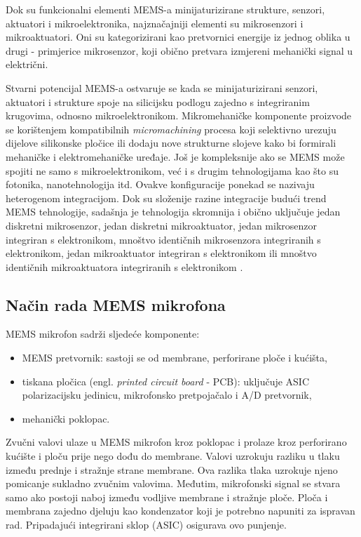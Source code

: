 Dok su funkcionalni elementi MEMS-a minijaturizirane strukture, senzori, aktuatori i mikroelektronika, najznačajniji elementi su mikrosenzori i mikroaktuatori. Oni su  kategorizirani kao pretvornici energije iz jednog oblika u drugi - primjerice mikrosenzor, koji obično pretvara izmjereni mehanički signal u električni.

Stvarni potencijal MEMS-a ostvaruje se kada se minijaturizirani senzori, aktuatori i strukture spoje na silicijsku podlogu zajedno s integriranim krugovima, odnosno mikroelektronikom. Mikromehaničke komponente proizvode se korištenjem kompatibilnih \textit{micromachining} procesa koji selektivno urezuju dijelove silikonske pločice ili dodaju nove strukturne slojeve kako bi formirali mehaničke i elektromehaničke uređaje. Još je kompleksnije ako se MEMS može spojiti ne samo s mikroelektronikom, već i s drugim tehnologijama kao što su fotonika, nanotehnologija itd. Ovakve konfiguracije ponekad se nazivaju heterogenom integracijom. Dok su složenije razine integracije budući trend MEMS tehnologije, sadašnja je tehnologija skromnija i obično uključuje jedan diskretni mikrosenzor, jedan diskretni mikroaktuator, jedan mikrosenzor integriran s elektronikom, mnoštvo identičnih mikrosenzora integriranih s elektronikom, jedan mikroaktuator integriran s elektronikom ili mnoštvo identičnih mikroaktuatora integriranih s elektronikom \cite{whatismems_tech}. 
 

\subsection{Način rada MEMS mikrofona}

MEMS mikrofon sadrži sljedeće komponente:
\begin{itemize}
	\item MEMS pretvornik: sastoji se od membrane, perforirane ploče i kućišta,
	\item tiskana pločica (engl. \textit{printed circuit board} - PCB): uključuje ASIC polarizacijsku jedinicu, mikrofonsko pretpojačalo i A/D pretvornik,
	\item mehanički poklopac.
\end{itemize}

Zvučni valovi ulaze u MEMS mikrofon kroz poklopac i prolaze kroz perforirano kućište i ploču prije nego dođu do membrane. Valovi uzrokuju razliku u tlaku između prednje i stražnje strane membrane. Ova razlika tlaka uzrokuje njeno pomicanje sukladno zvučnim valovima. Međutim, mikrofonski signal se stvara samo ako postoji naboj između vodljive membrane i stražnje ploče. 
Ploča i membrana zajedno djeluju kao kondenzator koji je potrebno napuniti za ispravan
rad. Pripadajući integrirani sklop (ASIC) osigurava ovo punjenje.

